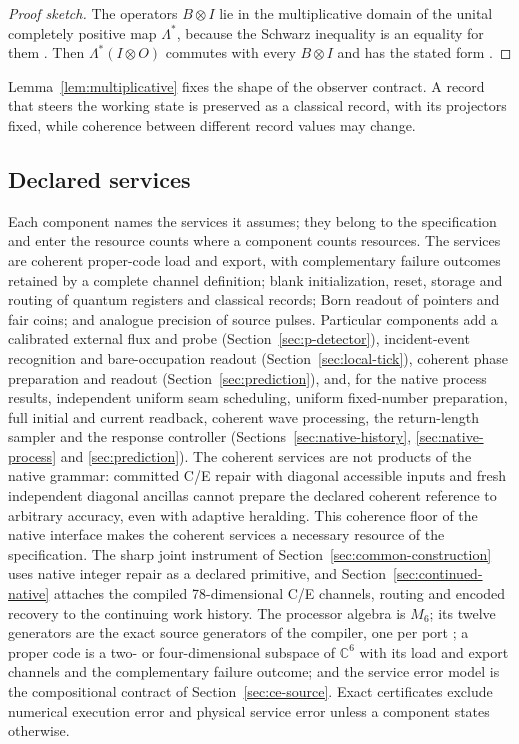 \documentclass[11pt]{article}
\theoremstyle{definition}
\theoremstyle{remark}
\theoremstyle{plain}
\newcommand{\C}{\mathbb{C}}
\begin{document}
\begin{proof}[Proof sketch]
The operators $B\otimes I$ lie in the multiplicative domain of the unital
completely positive map $\Lambda^*$, because the Schwarz inequality is an
equality for them \cite{choi1974}. Then $\Lambda^*(I\otimes O)$ commutes with
every $B\otimes I$ and has the stated form \cite{oDERIV}.
\end{proof}

Lemma~\ref{lem:multiplicative} fixes the shape of the observer contract. A
record that steers the working state is preserved as a classical record,
with its projectors fixed, while coherence between different record values
may change.

\subsection{Declared services}
\label{sec:services}

Each component names the services it assumes; they belong to the
specification and enter the resource counts where a component counts
resources. The services are coherent proper-code load and export, with
complementary failure outcomes retained by a complete channel definition;
blank initialization, reset, storage and routing of quantum registers and
classical records; Born readout of pointers and fair coins; and analogue
precision of source pulses. Particular components add a calibrated external
flux and probe (Section~\ref{sec:p-detector}), incident-event recognition
and bare-occupation readout (Section~\ref{sec:local-tick}), coherent
phase preparation and readout (Section~\ref{sec:prediction}), and, for the
native process results, independent uniform seam scheduling, uniform
fixed-number preparation, full initial and current readback, coherent wave
processing, the return-length sampler and the response controller
(Sections~\ref{sec:native-history}, \ref{sec:native-process} and
\ref{sec:prediction}). The coherent
services are not products of the native grammar: committed C/E repair with
diagonal accessible inputs and fresh independent diagonal ancillas cannot
prepare the declared coherent reference to arbitrary accuracy, even with
adaptive heralding. This coherence floor of the native interface makes the
coherent services a necessary resource of the specification. The sharp joint
instrument of Section~\ref{sec:common-construction} uses native integer
repair as a declared primitive, and Section~\ref{sec:continued-native}
attaches the compiled 78-dimensional C/E channels, routing and encoded
recovery to the continuing work history. The processor algebra is $M_6$; its twelve generators are the exact source generators of the compiler, one per port \cite{ssREADME,csDERIV}; a proper code is a two- or four-dimensional subspace of $\C^6$ with its load and export channels and the complementary failure outcome; and the service error model is the compositional contract of Section~\ref{sec:ce-source}. Exact certificates exclude numerical execution error
and physical service error unless a component states otherwise.
\end{document}
